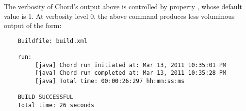 The verbosity of Chord's output above is controlled by property , whose
default value is 1.  At verbosity level 0, the above command produces less voluminous output
of the form:

\begin{framed}
{\small
\begin{verbatim}
    Buildfile: build.xml
    
    run:
         [java] Chord run initiated at: Mar 13, 2011 10:35:01 PM
         [java] Chord run completed at: Mar 13, 2011 10:35:28 PM
         [java] Total time: 00:00:26:297 hh:mm:ss:ms

    BUILD SUCCESSFUL
    Total time: 26 seconds
\end{verbatim}
}
\end{framed}
